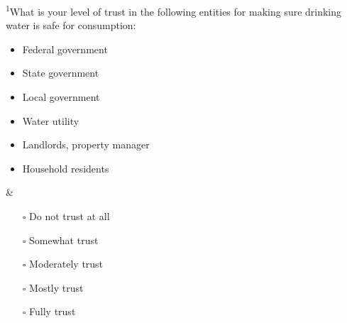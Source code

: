 \documentclass[
]{article}
\begin{document}
\begin{longtblr}[         %
caption={},
entry=none,label=none,
note{1}={Matrix style question.},
label=tblr:quest,
caption={Survey questions.},
]
\textsuperscript{1}What is your level of trust in the following entities for making sure drinking water is safe for consumption:    \begin{itemize}[nosep]    \item Federal government    \item State government    \item Local government    \item Water utility    \item Landlords, property manager    \item Household residents    \end{itemize}                                                                                                & \begin{itemize}[nosep]    \item[$\square$] Do not trust at all    \item[$\square$] Somewhat trust    \item[$\square$] Moderately trust    \item[$\square$] Mostly trust    \item[$\square$] Fully trust    \end{itemize}                                                                                                                                                                                                                                                                                                                                                                                                     \\

\end{longtblr}
\end{document}
